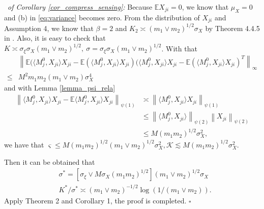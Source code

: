 \documentclass[12pt]{article}
\newenvironment{pf}{{\noindent\it Proof}\ }{\hfill $\square$\par}
\begin{document}
\begin{pf}{\it of Corollary \ref{cor_compress_sensing}:}
  Because $\mathbb{E}X_{ji}=0$, we know that $\mu_X=0$ and (b) in \eqref{eq:variance} becomes zero. From the distribution of $X_{ji}$ and Assumption 4, we know that $\beta=2$ and $K_2 \asymp (m_1\vee m_2)^{1/2}\sigma_X$ by Theorem 4.4.5 in \cite{vershynin2018high}. Also, it is easy to check that $K\asymp\sigma_\xi \sigma_X(m_1\vee m_2)^{1/2},\ \sigma = \sigma_\xi\sigma_X (m_1\vee m_2)^{1/2}$.
  With that
  \begin{align*}
  &\left\|\mathbb{E}(\langle M_j^0,X_{j i}\rangle X_{j i}- \mathbb{E}(\langle M_j^0,X_{j i}\rangle X_{j i})(\langle M_j^0,X_{j i}\rangle X_{j i}- \mathbb{E}(\langle M_j^0,X_{j i}\rangle X_{j i})^T\right\|_{\infty}
  \\\le &M^2 m_1m_2(m_1\vee m_2) \sigma^4_X
  \end{align*}
  and with Lemma \ref{lemma_psi_rela}
  \begin{align*}
      \left\|\langle M_j^0, X_{ji}\rangle X_{ji} - \mathbb{E}\langle M_j^0, X_{ji}\rangle X_{ji} \right\|_{\psi(1)} & \asymp \left\|\langle M_j^0,X_{ji}\rangle X_{ji} \right\|_{\psi(1)}
      \\& \le \left\|\langle M_j^0,X_{ji}\rangle\right\|_{\psi(2)}\left\|X_{ji}\right\|_{\psi(2)}
      \\&\le M (m_1m_2)^{1/2} \sigma_X^2,
  \end{align*}
  we have that $\varsigma\le M (m_1m_2)^{1/2}(m_1\vee m_2)^{1/2}\sigma^2_X,\mathcal{K}\lesssim M(m_1m_2)^{1/2}\sigma_X^2$.

  Then it can be obtained that 
  \begin{align*}
      &\sigma^* = \left[\sigma_{\xi}\vee M \sigma_X(m_1 m_2)^{1/2}\right](m_1\vee m_2)^{1/2}\sigma_X\\
      & K^*/\sigma^* \asymp (m_1\vee m_2)^{-1/2} \log(1/(m_1\vee m_2)).
  \end{align*}
  Apply Theorem 2 and Corollary 1, the proof is completed.
  \end{pf}
  
\end{document}
